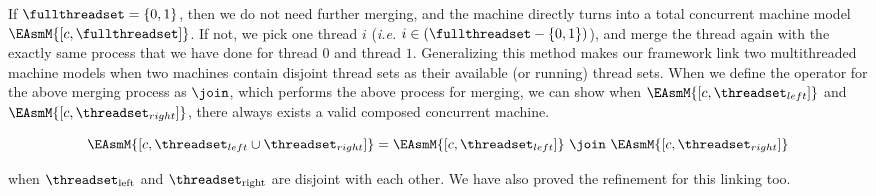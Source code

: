 If $\fullthreadset = \{0, 1\}$, then we do not need further merging, 
and the machine directly turns into a total concurrent machine 
model $\EAsmM{[c, \fullthreadset]}$. 
If not, we pick one thread $i$ (\textit{i.e.} $i \in (\fullthreadset - \{0, 1\})$), 
and merge the thread again with the exactly 
same process that we have done for thread $0$ and thread $1$.
Generalizing this method makes our framework link two multithreaded machine models 
when two machines contain disjoint thread sets as their available (or running) thread sets.
When we define the operator for the above merging process as $\join$, which performs the above 
process for merging,
we can show when $\EAsmM{[c, \threadset_{left}]}$ and $\EAsmM{[c, \threadset_{right}]}$,
there always exists a valid composed concurrent machine.
\begin{small}
\[
\EAsmM{[c, \threadset_{left} \cup \threadset_{right}]} = \EAsmM{[c, \threadset_{left}]}\ \join\ \EAsmM{[c, \threadset_{right}]}
 \]
 \end{small}
when $\threadset_{\mathrm{left}}$ and $\threadset_{\mathrm{right}}$ are disjoint with each other.
We have also proved the refinement for this linking too.

